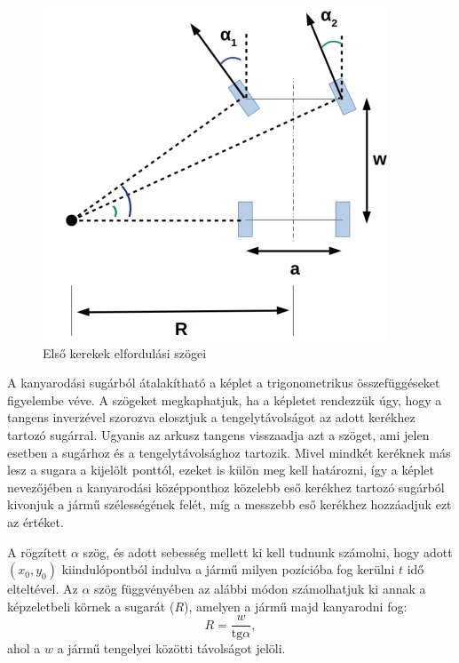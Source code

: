 \begin{figure}[h!]
\centering
\includegraphics[scale=0.5]{images/turning_vehicle.png}
\caption{Első kerekek elfordulási szögei}
\label{fig:turning_vehicle}
\end{figure}
\vspace{5mm}

A kanyarodási sugárból átalakítható a képlet a trigonometrikus összefüggéseket figyelembe véve. A szögeket megkaphatjuk, ha a képletet rendezzük úgy, hogy a tangens inverzével szorozva elosztjuk a tengelytávolságot az adott kerékhez tartozó sugárral. Ugyanis az arkusz tangens visszaadja azt a szöget, ami jelen esetben a sugárhoz és a tengelytávolsághoz tartozik. Mivel mindkét keréknek más lesz a sugara a kijelölt ponttól, ezeket is külön meg kell határozni, így a képlet nevezőjében a kanyarodási középponthoz közelebb eső kerékhez tartozó sugárból kivonjuk a jármű szélességének felét, míg a messzebb eső kerékhez hozzáadjuk ezt az értéket.



A rögzített $\alpha$ szög, és adott sebesség mellett ki kell tudnunk számolni, hogy adott $(x_0, y_0)$ kiindulópontból indulva a jármű milyen pozícióba fog kerülni $t$ idő elteltével. Az $\alpha$ szög függvényében az alábbi módon számolhatjuk ki annak a képzeletbeli körnek a sugarát ($R$), amelyen a jármű majd kanyarodni fog:
\[
R = \dfrac{w}{\text{tg} \alpha},
\]
ahol a $w$ a jármű tengelyei közötti távolságot jelöli.

